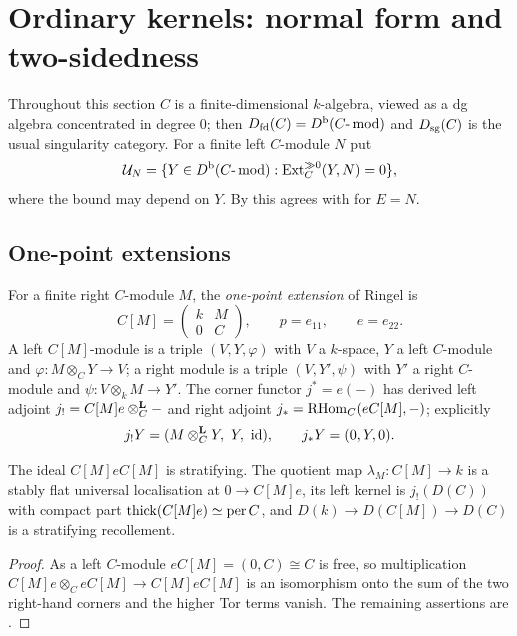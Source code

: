 \section{Ordinary kernels: normal form and two-sidedness}\label{sec:ordinary}

Throughout this section \(C\) is a finite-dimensional \(k\)-algebra, viewed as a dg algebra concentrated in degree \(0\); then \(D_{\mathrm{fd}}(C)=D^{\mathrm b}(C\text{-}\operatorname{mod})\) and \(D_{\mathrm{sg}}(C)\) is the usual singularity category.  For a finite left \(C\)-module \(N\) put
\begin{equation}\label{eq:UN}
 \mathcal U_N=\{Y\in D^{\mathrm b}(C\text{-}\operatorname{mod}):\operatorname{Ext}^{\gg0}_C(Y,N)=0\},
\end{equation}
where the bound may depend on \(Y\).  By  this agrees with  for \(E=N\).

\subsection{One-point extensions}
For a finite right \(C\)-module \(M\), the \emph{one-point extension} of Ringel \cite{Ringel84} is
\[
 C[M]=\begin{pmatrix}k&M\\0&C\end{pmatrix},\qquad p=e_{11},\qquad e=e_{22}.
\]
A left \(C[M]\)-module is a triple \((V,Y,\varphi)\) with \(V\) a \(k\)-space, \(Y\) a left \(C\)-module and \(\varphi:M\otimes_CY\to V\); a right module is a triple \((V,Y',\psi)\) with \(Y'\) a right \(C\)-module and \(\psi:V\otimes_kM\to Y'\).  The corner functor \(j^*=e(-)\) has derived left adjoint \(j_!=C[M]e\otimes^{\mathbf L}_C-\) and right adjoint \(j_*=\operatorname{RHom}_C(eC[M],-)\); explicitly
\begin{equation}\label{eq:ope-functors}
 j_!Y=(M\otimes^{\mathbf L}_CY,\ Y,\ \operatorname{id}),\qquad j_*Y=(0,Y,0).
\end{equation}

\begin{lemma}\label{lem:ope-stratifying}
The ideal \(C[M]eC[M]\) is stratifying.  The quotient map \(\lambda_M:C[M]\to k\) is a stably flat universal localisation at \(0\to C[M]e\), its left kernel is \(j_!(D(C))\) with compact part \(\operatorname{thick}(C[M]e)\simeq\operatorname{per} C\), and \(D(k)\to D(C[M])\to D(C)\) is a stratifying recollement.
\end{lemma}

\begin{proof}
As a left \(C\)-module \(eC[M]=(0,C)\cong C\) is free, so multiplication \(C[M]e\otimes_CeC[M]\to C[M]eC[M]\) is an isomorphism onto the sum of the two right-hand corners and the higher Tor terms vanish.  The remaining assertions are .
\end{proof}

